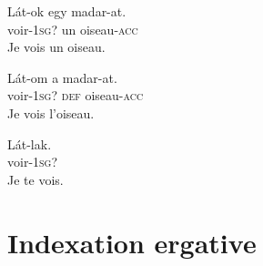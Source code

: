 \documentclass[oldfontcommands,twoside,a4paper,12pt]{article}
\newcommand{\ipa}[1]{{\phon\textbf{#1}}}
\begin{document}
  \begin{exe}
\ex 
\gll  Lát-ok egy madar-at.\\
voir-\textsc{1sg?} un oiseau-\textsc{acc} \\
\glt Je vois un oiseau.
\end{exe} 
 
 \begin{exe}
\ex 
\gll  Lát-om a madar-at.\\
voir-\textsc{1sg?} \textsc{def} oiseau-\textsc{acc} \\
\glt Je vois l'oiseau.
\end{exe}
 
  \begin{exe}
\ex 
\gll  Lát-lak.\\
voir-\textsc{1sg?}   \\
\glt Je te vois.
\end{exe}

 
 
 \section{Indexation ergative}
%
\end{document}
